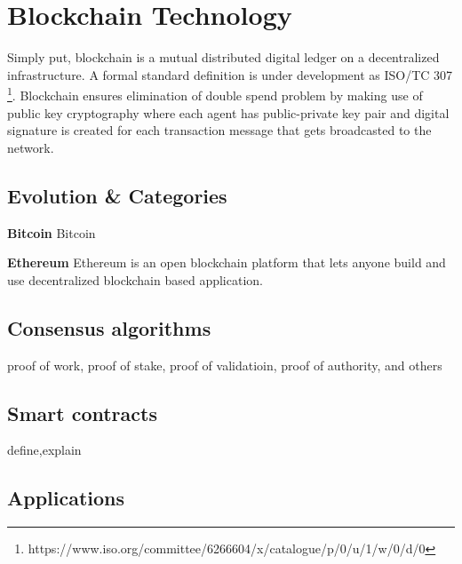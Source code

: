 \section{Blockchain Technology}
Simply put, blockchain is a mutual distributed digital ledger on a 
decentralized infrastructure. A formal standard definition is under 
development as ISO/TC 307
\footnote{https://www.iso.org/committee/6266604/x/catalogue/p/0/u/1/w/0/d/0}. 
Blockchain ensures elimination of double spend problem by making use of 
public key cryptography where each agent has public-private key pair and 
digital signature is created for each transaction message that gets 
broadcasted to the network. 
\cite{pilkington201611}


\subsection{Evolution \& Categories}
\textbf{Bitcoin}
Bitcoin 


\textbf{Ethereum}
Ethereum is an open blockchain platform that lets anyone build and use 
decentralized blockchain based application. 
\cite{buterin2013ethereum} 




\subsection{Consensus algorithms}
proof of work, proof of stake, proof of validatioin, proof of authority, and others


\subsection{Smart contracts}
define,explain
\subsection{Applications}




